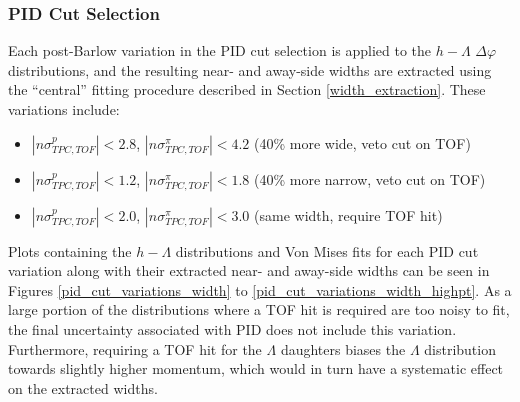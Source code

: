 \documentclass[ALICE,manyauthors]{ALICE_analysis_notes}
\begin{document}
\subsubsection{PID Cut Selection}
\label{pid_cut_selection_systematics_width}
Each post-Barlow variation in the PID cut selection is applied to the $h-\Lambda$ $\Delta\varphi$ distributions, and the resulting near- and away-side widths are extracted using the ``central'' fitting procedure described in Section \ref{width_extraction}. These variations include:

\begin{itemize}
\item $|n\sigma_{TPC, TOF}^{p}| < 2.8$, $|n\sigma_{TPC, TOF}^{\pi}| < 4.2$ (40\% more wide, veto cut on TOF)
\item $|n\sigma_{TPC, TOF}^{p}| < 1.2$, $|n\sigma_{TPC,TOF}^{\pi}| < 1.8$ (40\% more narrow, veto cut on TOF)
\item $|n\sigma_{TPC, TOF}^{p}| < 2.0$, $|n\sigma_{TPC,TOF}^{\pi}| < 3.0$ (same width, require TOF hit)
\end{itemize}

Plots containing the $h-\Lambda$ distributions and Von Mises fits for each PID cut variation along with their extracted near- and away-side widths can be seen in Figures \ref{pid_cut_variations_width} to \ref{pid_cut_variations_width_highpt}. As a large portion of the distributions where a TOF hit is required are too noisy to fit, the final uncertainty associated with PID does not include this variation. Furthermore, requiring a TOF hit for the $\Lambda$ daughters biases the $\Lambda$ distribution towards slightly higher momentum, which would in turn have a systematic effect on the extracted widths.
\end{document}
